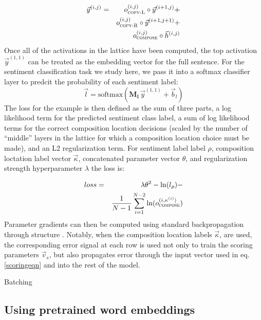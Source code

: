 \begin{eqnarray}
\vec{y}^{(i,j)} & = & o^{(i, j)}_{\textsc{copy-L}} \circ \vec{y}^{(i + 1, j)} +\\
&&\nonumber o^{(i, j)}_{\textsc{copy-R}} \circ \vec{y}^{(i + 1, j + 1)} +\\
&&\nonumber o^{(i, j)}_{\textsc{compose}} \circ \vec{h}^{(i, j)}
\end{eqnarray}
%
Once all of the activations in the lattice have been computed, the top activation $\vec{y}^{(1,1)}$ can be treated as the embedding vector for the full sentence. For the sentiment classification task we study here, we pass it into a softmax classifier layer to predcit the probability of each sentiment label:
%
\begin{equation}
\vec{l} = \text{softmax}(\mathbf{M_l}\,\vec{y}^{(1, 1)} + \vec{b}_l)
\end{equation}
%
The loss for the example is then defined as the sum of three parts, a log likelihood term for the predicted sentiment class label, a sum of log likelihood terms for the correct composition location decisions (scaled by the number of ``middle'' layers in the lattice for which a composition location choice must be made), and an L2 regularization term. For sentiment label label $\rho$, composition loctation label vector $\vec{\kappa}$, concatenated parameter vector $\theta$, and regularization strength hyperparameter $\lambda$ the loss is:
%

\begin{eqnarray}
loss & = & \lambda\theta^2 - \ln(l_\rho) -\\
\nonumber&&\frac{1}{N - 1} \sum_{i = 1}^{N - 2} \ln(o^{(i,\kappa^{(i)})}_{\textsc{compose}})
\end{eqnarray}
%
Parameter gradients can then be computed using standard backpropagation through structure \cite{goller1996learning}. Notably, when the composition location labels $\vec{\kappa}$, are used, the corresponding error signal at each row is used not only to train the scoring parameters $\vec{v}_s$, but also propagates error through the input vector used in eq. \ref{scoringeqn} and into the rest of the model.

Batching

\subsection{Using pretrained word embeddings}

